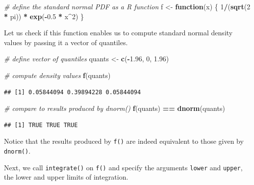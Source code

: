 \documentclass[]{book}
\newenvironment{Shaded}{\begin{snugshade}}{\end{snugshade}}
\newcommand{\KeywordTok}[1]{\textcolor[rgb]{0.13,0.29,0.53}{\textbf{#1}}}
\newcommand{\DecValTok}[1]{\textcolor[rgb]{0.00,0.00,0.81}{#1}}
\newcommand{\FloatTok}[1]{\textcolor[rgb]{0.00,0.00,0.81}{#1}}
\newcommand{\StringTok}[1]{\textcolor[rgb]{0.31,0.60,0.02}{#1}}
\newcommand{\CommentTok}[1]{\textcolor[rgb]{0.56,0.35,0.01}{\textit{#1}}}
\newcommand{\ControlFlowTok}[1]{\textcolor[rgb]{0.13,0.29,0.53}{\textbf{#1}}}
\newcommand{\OperatorTok}[1]{\textcolor[rgb]{0.81,0.36,0.00}{\textbf{#1}}}
\newcommand{\NormalTok}[1]{#1}
\theoremstyle{definition}
\theoremstyle{definition}
\theoremstyle{definition}
\theoremstyle{remark}
\begin{document}
\begin{Shaded}
\begin{Highlighting}[]
\CommentTok{# define the standard normal PDF as a R function}
\NormalTok{f <-}\StringTok{ }\ControlFlowTok{function}\NormalTok{(x) \{}
  \DecValTok{1}\OperatorTok{/}\NormalTok{(}\KeywordTok{sqrt}\NormalTok{(}\DecValTok{2} \OperatorTok{*}\StringTok{ }\NormalTok{pi)) }\OperatorTok{*}\StringTok{ }\KeywordTok{exp}\NormalTok{(}\OperatorTok{-}\FloatTok{0.5} \OperatorTok{*}\StringTok{ }\NormalTok{x}\OperatorTok{^}\DecValTok{2}\NormalTok{)}
\NormalTok{\}}
\end{Highlighting}
\end{Shaded}

Let us check if this function enables us to compute standard normal
density values by passing it a vector of quantiles.

\begin{Shaded}
\begin{Highlighting}[]
\CommentTok{# define vector of quantiles}
\NormalTok{quants <-}\StringTok{ }\KeywordTok{c}\NormalTok{(}\OperatorTok{-}\FloatTok{1.96}\NormalTok{, }\DecValTok{0}\NormalTok{, }\FloatTok{1.96}\NormalTok{)}

\CommentTok{# compute density values}
\KeywordTok{f}\NormalTok{(quants)}
\end{Highlighting}
\end{Shaded}

\begin{verbatim}
## [1] 0.05844094 0.39894228 0.05844094
\end{verbatim}

\begin{Shaded}
\begin{Highlighting}[]
\CommentTok{# compare to results produced by dnorm()}
\KeywordTok{f}\NormalTok{(quants) }\OperatorTok{==}\StringTok{ }\KeywordTok{dnorm}\NormalTok{(quants)}
\end{Highlighting}
\end{Shaded}

\begin{verbatim}
## [1] TRUE TRUE TRUE
\end{verbatim}

Notice that the results produced by \texttt{f()} are indeed equivalent
to those given by \texttt{dnorm()}.

Next, we call \texttt{integrate()} on \texttt{f()} and specify the
arguments \texttt{lower} and \texttt{upper}, the lower and upper limits
of integration.
\end{document}
